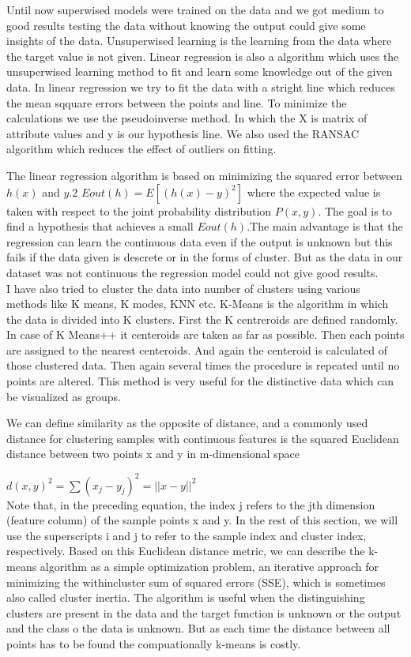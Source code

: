 \documentclass[conference,compsoc]{IEEEtran}
\begin{document}
Until now superwised models were trained on the data and we got medium to good results
testing the data without knowing the output could give some insights of the data.
Unsuperwised learning is the learning
from the data where the target value is not
given. Linear regression is also a algorithm
which uses the unsuperwised learning method to
fit and learn some knowledge out of the given
data.
In linear regression we try to fit the data
with a stright line which reduces the mean
sqquare errors between the points and line.
To minimize the calculations we use the pseudoinverse method. In which the X is matrix of
attribute values and y is our hypothesis line.
We also used the RANSAC algorithm
which reduces the effect of outliers on fitting.

The linear regression algorithm is based
on minimizing the squared error between $h(x)$
and $y.2$
$Eout(h) = E [(h(x)- y)^2]$
where the expected value is taken with respect
to the joint probability distribution $P(x, y)$. The
goal is to find a hypothesis that achieves a small
$Eout(h)$.The main advantage is that the regression can learn the continuous data even if the output is unknown but this fails if the data given is descrete or in the forms of cluster.
But as the data in our dataset was not continuous the regression model could not give good results.\\

I have also tried to cluster the data into number of clusters using various methods like K means, K modes, KNN etc.
K-Means is the algorithm in which the
data is divided into K clusters. First the K
centreroids are defined randomly. In case of K
Means++ it centeroids are taken as far as
possible. Then each points are assigned to the
nearest centeroids. And again the centeroid is
calculated of those clustered data. Then again
several times the procedure is repeated until no
points are altered.
This method is very useful for the
distinctive data which can be visualized as
groups.

We can define similarity as the opposite of
distance, and a commonly used distance for
clustering samples with continuous features is
the squared Euclidean distance between two
points x and y in m-dimensional space

$d(x,y)^2 = \sum(x_{j}-y_{j})^2 = ||x-y||^2$\\
Note that, in the preceding equation, the index j
refers to the jth dimension (feature column) of
the sample points x and y. In the rest of this
section, we will use the superscripts i and j to
refer to the sample index and cluster index,
respectively. Based on this Euclidean distance
metric, we can describe the k-means algorithm
as a simple optimization problem, an iterative
approach for minimizing the withincluster sum
of squared errors (SSE), which is sometimes
also called cluster inertia.
The algorithm is useful when the distinguishing clusters are present in the data and the target function is unknown or the output and the class o the data is unknown. But as each time the distance between all points has to be found the compuationally k-means is costly. \\
\end{document}
